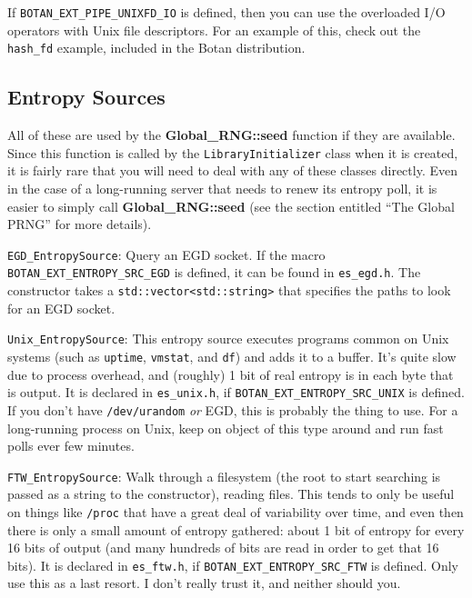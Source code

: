 \documentclass{article}
\newcommand{\filename}[1]{\texttt{#1}}
\newcommand{\macro}[1]{\texttt{#1}}
\newcommand{\function}[1]{\textbf{#1}}
\newcommand{\type}[1]{\texttt{#1}}
\begin{document}
If \macro{BOTAN\_EXT\_PIPE\_UNIXFD\_IO} is defined, then you can use the
overloaded I/O operators with Unix file descriptors. For an example of this,
check out the \filename{hash\_fd} example, included in the Botan distribution.

\subsection{Entropy Sources}

All of these are used by the \function{Global\_RNG::seed} function if they are
available. Since this function is called by the \type{LibraryInitializer} class
when it is created, it is fairly rare that you will need to deal with any of
these classes directly. Even in the case of a long-running server that needs to
renew its entropy poll, it is easier to simply call
\function{Global\_RNG::seed} (see the section entitled ``The Global PRNG'' for
more details).

\noindent
\type{EGD\_EntropySource}: Query an EGD socket. If the macro
\macro{BOTAN\_EXT\_ENTROPY\_SRC\_EGD} is defined, it can be found in
\filename{es\_egd.h}. The constructor takes a \type{std::vector<std::string>}
that specifies the paths to look for an EGD socket.

\noindent
\type{Unix\_EntropySource}: This entropy source executes programs common on
Unix systems (such as \filename{uptime}, \filename{vmstat}, and \filename{df})
and adds it to a buffer. It's quite slow due to process overhead, and (roughly)
1 bit of real entropy is in each byte that is output. It is declared in
\filename{es\_unix.h}, if \macro{BOTAN\_EXT\_ENTROPY\_SRC\_UNIX} is
defined. If you don't have \filename{/dev/urandom} \emph{or} EGD, this is
probably the thing to use. For a long-running process on Unix, keep on object
of this type around and run fast polls ever few minutes.

\noindent
\type{FTW\_EntropySource}: Walk through a filesystem (the root to start
searching is passed as a string to the constructor), reading files. This tends
to only be useful on things like \filename{/proc} that have a great deal of
variability over time, and even then there is only a small amount of entropy
gathered: about 1 bit of entropy for every 16 bits of output (and many hundreds
of bits are read in order to get that 16 bits). It is declared in
\filename{es\_ftw.h}, if \macro{BOTAN\_EXT\_ENTROPY\_SRC\_FTW} is defined. Only
use this as a last resort. I don't really trust it, and neither should you.
\end{document}
